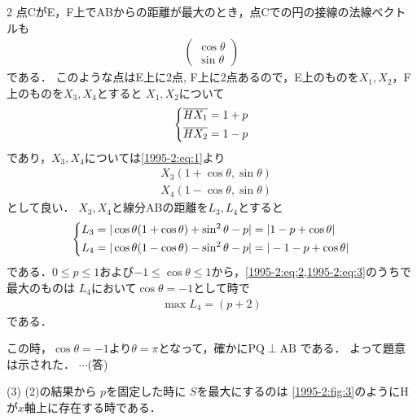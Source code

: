 \documentclass[../../../../main.tex]{subfiles}
\begin{document}
\begin{multicols}{2}
  点CがE，F上でABからの距離が最大のとき，点Cでの円の接線の法線ベクトルも
  \begin{align}
    \begin{pmatrix} \cos\theta \\ \sin\theta \end{pmatrix} \label{1995-2:eq:1}
  \end{align}
  である．
  このような点はE上に2点, F上に2点あるので，E上のものを$X_1, X_2$，F上のものを$X_3, X_4$とすると
  $X_1,X_2$について
  \begin{align}
    \begin{dcases}
      \overline{HX_1} = 1 + p \\
      \overline{HX_2} = 1 - p
    \end{dcases} \label{1995-2:eq:2}
  \end{align}
  であり，$X_3, X_4$については\cref{1995-2:eq:1}より
  \begin{align*}
     & X_3(1+\cos\theta, \sin\theta) \\
     & X_4(1-\cos\theta, \sin\theta)
  \end{align*}
  として良い．
  $X_3,X_4$と線分ABの距離を$L_3,L_4$とすると
  \begin{align}
    \begin{dcases}
      L_3 = |\cos\theta(1+\cos\theta)+\sin^2\theta-p| = |1-p+\cos\theta| \\
      L_4 = |\cos\theta(1-\cos\theta)-\sin^2\theta-p| = |-1-p+\cos\theta|
    \end{dcases}\label{1995-2:eq:3}
  \end{align}
  である．$0 \le p \le 1$および$-1 \le \cos\theta \le 1$から，\cref{1995-2:eq:2,1995-2:eq:3}のうちで最大のものは
  $L_4$において$\cos\theta = -1$として時で
  \begin{align*}
    \max L_4 = (p+2)
  \end{align*}
  である．

  この時，$\cos\theta=-1$より$\theta=\pi$となって，確かに$\mathrm{PQ} \perp \mathrm{AB}$ である．
  よって題意は示された．
  $\cdots$(答)
  \vspace{10pt}

  (3)
  (2)の結果から $p$を固定した時に $S$を最大にするのは
  \cref{1995-2:fig:3}のようにHが$x$軸上に存在する時である．


\end{multicols}
\end{document}
